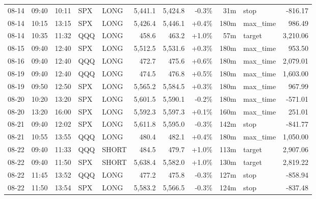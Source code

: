 \documentclass[11pt,a4paper,twoside]{article}
\begin{document}
\begin{center}
\begin{longtable}{>{\color{txtmain}}l l l l l r r r r >{\color{txtmain}}l r}
08-14 & 09:40 & 10:11 & SPX & LONG & 5,441.1 & 5,424.8 & \textcolor{lossred}{-0.3\%} & 31m & stop & \textcolor{lossred}{-816.17} \\
08-14 & 10:15 & 13:15 & SPX & LONG & 5,426.4 & 5,446.1 & \textcolor{wingreen}{+0.4\%} & 180m & max\_time & \textcolor{wingreen}{986.49} \\
08-14 & 10:35 & 11:32 & QQQ & LONG & 458.6 & 463.2 & \textcolor{wingreen}{+1.0\%} & 57m & target & \textcolor{wingreen}{3,210.06} \\
08-15 & 09:40 & 12:40 & SPX & LONG & 5,512.5 & 5,531.6 & \textcolor{wingreen}{+0.3\%} & 180m & max\_time & \textcolor{wingreen}{953.50} \\
08-16 & 09:40 & 12:40 & QQQ & LONG & 472.7 & 475.6 & \textcolor{wingreen}{+0.6\%} & 180m & max\_time & \textcolor{wingreen}{2,079.01} \\
08-19 & 09:40 & 12:40 & QQQ & LONG & 474.5 & 476.8 & \textcolor{wingreen}{+0.5\%} & 180m & max\_time & \textcolor{wingreen}{1,603.00} \\
08-19 & 09:50 & 12:50 & SPX & LONG & 5,565.2 & 5,584.5 & \textcolor{wingreen}{+0.3\%} & 180m & max\_time & \textcolor{wingreen}{967.99} \\
08-20 & 10:20 & 13:20 & SPX & LONG & 5,601.5 & 5,590.1 & \textcolor{lossred}{-0.2\%} & 180m & max\_time & \textcolor{lossred}{-571.01} \\
08-20 & 13:20 & 16:00 & SPX & LONG & 5,592.3 & 5,597.3 & \textcolor{wingreen}{+0.1\%} & 160m & max\_time & \textcolor{wingreen}{251.01} \\
08-21 & 09:40 & 12:02 & SPX & LONG & 5,611.8 & 5,595.0 & \textcolor{lossred}{-0.3\%} & 142m & stop & \textcolor{lossred}{-841.77} \\
08-21 & 10:55 & 13:55 & QQQ & LONG & 480.4 & 482.1 & \textcolor{wingreen}{+0.4\%} & 180m & max\_time & \textcolor{wingreen}{1,050.00} \\
08-22 & 09:40 & 11:33 & QQQ & SHORT & 484.5 & 479.7 & \textcolor{wingreen}{+1.0\%} & 113m & target & \textcolor{wingreen}{2,907.06} \\
08-22 & 09:40 & 11:50 & SPX & SHORT & 5,638.4 & 5,582.0 & \textcolor{wingreen}{+1.0\%} & 130m & target & \textcolor{wingreen}{2,819.22} \\
08-22 & 11:45 & 13:52 & QQQ & LONG & 477.2 & 475.8 & \textcolor{lossred}{-0.3\%} & 127m & stop & \textcolor{lossred}{-858.94} \\
08-22 & 11:50 & 13:54 & SPX & LONG & 5,583.2 & 5,566.5 & \textcolor{lossred}{-0.3\%} & 124m & stop & \textcolor{lossred}{-837.48} \\

\end{longtable}
\end{center}
\end{document}
